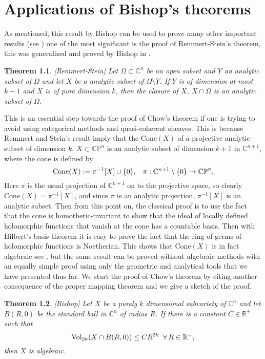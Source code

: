 \documentclass[12pt,twoside,a4paper]{report}
\newtheorem{theorem}{Theorem}[section]
\newcommand{\co}{\ensuremath{\mathbb C }}
\newcommand{\con}{\ensuremath{\mathbb{C}^n}}
\newcommand{\cp}{\ensuremath{\mathbb{CP}}}
\newcommand{\re}{\ensuremath{\mathbb R }}
\begin{document}
\chapter{Applications of Bishop's theorems}

\noindent As mentioned, this result by Bishop can be used to prove many other important
results (see \cite{Stolzenberg}) one of the most significant is the proof of
Remmert-Stein's theorem, this was generalized and proved by Bishop in
\cite{Bishop}.

\begin{theorem}\label{Rem-Stein}[Remmert-Stein]
        Let $\Omega\subset\con$ be an open subset and $Y$ an analytic subset
        of $\Omega$ and let $X$ be a analytic subset of
        $\Omega\setminus Y$. If $Y$ is of dimension at most $k-1$ and $X$ is of pure dimension $k$,
        then the closure of $X$, $\overline{X}\cap\Omega$ is an analytic subset of $\Omega$.
\end{theorem}
This is an essential step towards the proof of Chow's theorem if one is trying to avoid using categorical methods and
quasi-coherent sheaves. This is because Remmert and Stein's result imply that the $\textrm{Cone}(X)$ of a projective analytic
subset of dimension $k$, $X\subset\cp^n$ is an analytic subset of dimension $k+1$ in $\co^{n+1}$, where the cone is defined by
\begin{equation}
\textrm{Cone}(X):=\pi^{-1}[X]\cup\lbrace0\rbrace,\hspace{0.3cm}\pi:\co^{n+1}\setminus\lbrace 0\rbrace\rightarrow\cp^n.
\end{equation}
\noindent Here $\pi$ is the usual projection of $\co^{n+1}$ on to the
projective space, so clearly $\textrm{Cone}(X)=\overline{\pi^{-1}[X]}$, and since $\pi$
is an analytic projection, $\pi^{-1}[X]$ is an analytic subset. Then from this
point on, the classical proof is to use the fact that the cone is homothetic-invariant to
show that the ideal of locally defined holomorphic functions that vanish at the
cone has a countable basis. Then with Hilbert's basis theorem it is easy to prove the
fact that the ring of germs of holomorphic functions is Noetherian. This shows
that $\textrm{Cone}(X)$ is in fact algebraic see \cite{Chirka}, but the same result can
be proved without algebraic methods with an equally simple proof using only
the geometric and analytical tools that we have presented thus far.  We start
the proof of Chow's theorem by citing another consequence of the proper mapping
theorem and we give a sketch of the proof.
\begin{theorem}\label{bishop}[Bishop]
        Let $X$ be a purely $k$ dimensional subvariety of $\con$ and
        let $B(R,0)$ be the standard ball in $\con$ of
        radius $R$. If there is  a constant $C\in\re^{+}$ such that
        \begin{equation}
                \textrm{Vol}_{2k}(X\cap B(R,0))\leq CR^{2k} \hspace*{0.2cm}\forall\, R\in\re^{+},
        \end{equation} then $X$ is algebraic.
\end{theorem}
\end{document}
